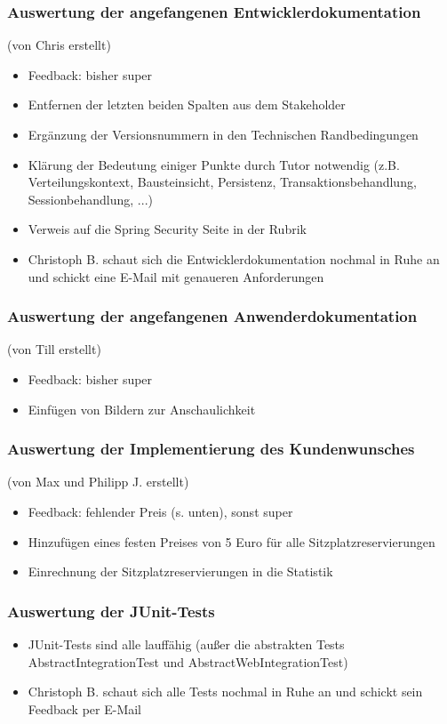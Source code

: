 \documentclass[12pt,a4paper]{article}
\begin{document}
\subsubsection*{Auswertung der angefangenen Entwicklerdokumentation}
(von Chris erstellt)
\begin{itemize}
\item Feedback: bisher super
\item Entfernen der letzten beiden Spalten aus dem Stakeholder
\item Ergänzung der Versionsnummern in den Technischen Randbedingungen
\item Klärung der Bedeutung einiger Punkte durch Tutor notwendig (z.B. Verteilungskontext, Bausteinsicht, Persistenz, Transaktionsbehandlung, Sessionbehandlung, ...)
\item Verweis auf die Spring Security Seite in der Rubrik
\item Christoph B. schaut sich die Entwicklerdokumentation nochmal in Ruhe an und schickt eine E-Mail mit genaueren Anforderungen
\end{itemize}

\subsubsection*{Auswertung der angefangenen Anwenderdokumentation}
(von Till erstellt)
\begin{itemize}
\item Feedback: bisher super
\item Einfügen von Bildern zur Anschaulichkeit
\end{itemize}

\subsubsection*{Auswertung der Implementierung des Kundenwunsches}
(von Max und Philipp J. erstellt)
\begin{itemize}
\item Feedback: fehlender Preis (s. unten), sonst super
\item Hinzufügen eines festen Preises von 5 Euro für alle Sitzplatzreservierungen
\item Einrechnung der Sitzplatzreservierungen in die Statistik
\end{itemize}

\subsubsection*{Auswertung der JUnit-Tests}
\begin{itemize}
\item JUnit-Tests sind alle lauffähig (außer die abstrakten Tests AbstractIntegrationTest und AbstractWebIntegrationTest) 
\item Christoph B. schaut sich alle Tests nochmal in Ruhe an und schickt sein Feedback per E-Mail
\end{itemize}
\end{document}
